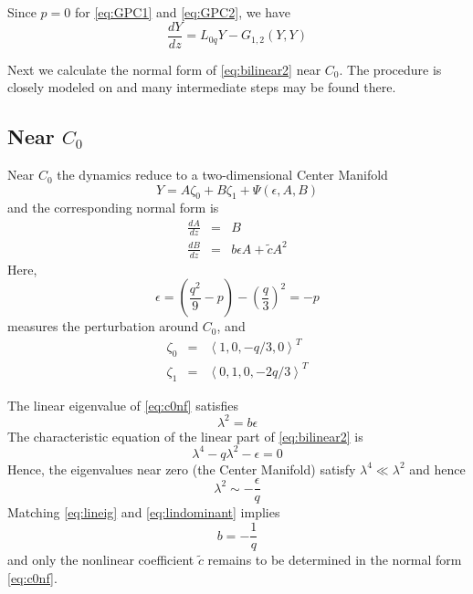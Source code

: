 Since $p=0$ for \eqref{eq:GPC1} and \eqref{eq:GPC2}, we have 
\begin{equation} \label{eq:bilinear2}
 \frac{ dY }{ dz } = L_{0q} Y - G_{1,2}(Y,Y) 
\end{equation}

Next we calculate the normal form of \eqref{eq:bilinear2} near $C_0$. The procedure is
closely modeled on \cite{IA} and many intermediate steps may be found there. 


\subsection{ Near $C_0$ }

Near $C_0$ the dynamics reduce to a two-dimensional Center Manifold
\begin{equation}\label{eq:c0cm}
 Y = A \zeta_0 + B \zeta_1 + \Psi(\epsilon,A,B)
\end{equation}
and the corresponding normal form is
\begin{subequations}\label{eq:c0nf}
\begin{eqnarray}
\frac{dA}{dz} &=& B \label{eq:c0nfa} \\
\frac{dB}{dz} &=& b \epsilon A + \tilde{c} A^2 \label{eq:c0nfb}
\end{eqnarray}
\end{subequations}
Here,
\begin{equation}
\epsilon = \left( \frac{q^2}{9} - p\right) - \left(\frac{q}{3}\right)^2 = - p 
\end{equation}
measures the perturbation around $C_0$, and
\begin{subequations}\label{eq:lineareigs}
\begin{eqnarray}
\zeta_0 &=& \left<1,0,-q/3,0\right>^T\\
\zeta_1 &=& \left<0,1,0,-2 q/3\right>^T 
\end{eqnarray}
\end{subequations}

The linear eigenvalue of \eqref{eq:c0nf} satisfies 
\begin{equation}\label{eq:lineig}
\lambda^2 = b \epsilon 
\end{equation}
The characteristic equation of the linear part of 
\eqref{eq:bilinear2} is 
\begin{equation}\label{eq:charlinear}
\lambda^4 - q \lambda^2 - \epsilon =  0 
\end{equation}
Hence, the eigenvalues near zero (the Center Manifold) satisfy $\lambda^4 \ll \lambda^2$ and hence 
\begin{equation}\label{eq:lindominant}
\lambda^2 \sim -\frac{\epsilon}{q}
\end{equation}
Matching \eqref{eq:lineig} and \eqref{eq:lindominant} implies
\begin{equation}
b = - \frac{1}{q}
\end{equation}
and only the nonlinear coefficient $\tilde{c}$ remains to be determined in the normal form \eqref{eq:c0nf}.

